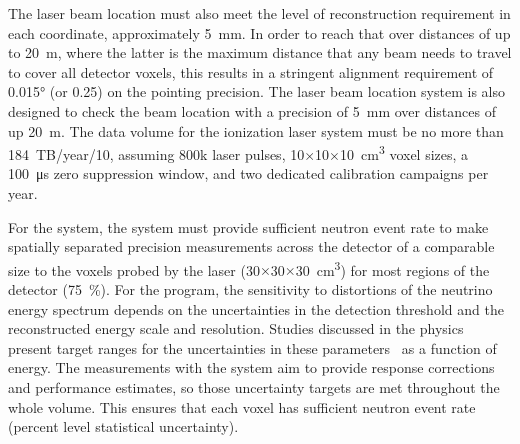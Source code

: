 The laser beam location must also meet the level of reconstruction requirement in each coordinate, approximately \SI{5}{\milli\m}. In order to reach that over distances of up to \SI{20}{\m}, where the latter is the maximum distance that any beam needs to travel to cover all detector voxels, this results in a stringent alignment requirement of \ang{0.015} (or \SI{0.25}{\mrad}) on the pointing precision. The laser beam location system is also designed to check the beam location with a precision of \SI{5}{\milli\m} over distances of up \SI{20}{\m}.
The data volume for the ionization laser system must be %
no more than \num{184}~TB/year/\SI{10}{\kt}, assuming \num{800}k laser pulses, \num{10}$\times$\num{10}$\times$\SI{10}{\cubic\cm} voxel sizes, a \SI{100}{\micro\s} zero suppression window, and two dedicated calibration campaigns per year.

For the  system, the system must provide sufficient neutron event rate to make spatially separated precision measurements across the detector of a comparable size to the voxels probed by the laser (\num{30}$\times$\num{30}$\times$\SI{30}{\cubic\cm}) for most regions of the detector (\SI{75}{\%}). 
For the  program, the sensitivity to distortions of the neutrino energy spectrum depends on the uncertainties in the detection threshold and the reconstructed energy scale and resolution. Studies discussed in the physics  present target ranges for the uncertainties in these parameters~\cite{bib:docdb14068} as a function of energy. The measurements with the  system aim to provide response corrections and performance estimates, so those uncertainty targets are met throughout the whole volume. This ensures that each voxel has sufficient neutron event rate (percent level statistical uncertainty).

